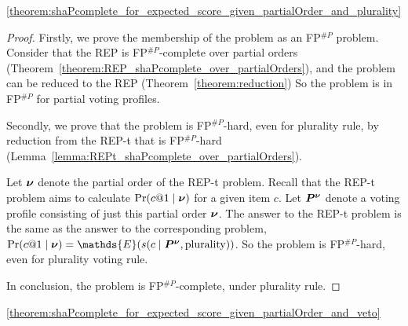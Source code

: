 \begin{reptheorem}{\ref{theorem:shaPcomplete_for_expected_score_given_partialOrder_and_plurality}}
    \theoremHardnessForEscGivenPartialOrderAndPlurality
\end{reptheorem}

\begin{proof}
    Firstly, we prove the membership of the \esc problem as an FP$^{\#P}$ problem.
    Consider that the REP is FP$^{\#P}$-complete over partial orders (Theorem~\ref{theorem:REP_shaPcomplete_over_partialOrders}), and the \esc problem can be reduced to the REP (Theorem~\ref{theorem:reduction})
    So the \esc problem is in FP$^{\#P}$ for partial voting profiles.
    
    Secondly, we prove that the \esc problem is FP$^{\#P}$-hard, even for plurality rule, by  reduction from the REP-t that is FP$^{\#P}$-hard (Lemma~\ref{lemma:REPt_shaPcomplete_over_partialOrders}).
    
    Let $\bm{\nu}$ denote the partial order of the REP-t problem.
    Recall that the REP-t problem aims to calculate $\Pr(c@1 \mid \bm{\nu})$ for a given item $c$.
    Let $\bm{P}^{\bm{\nu}}$ denote a voting profile consisting of just this partial order $\bm{\nu}$.
    The answer to the REP-t problem is the same as the answer to the corresponding \esc problem, \ie $\Pr(c@1 \mid \partialOrder) = \mathds{E}(\score(c \mid \VP^{\partialOrder}, \text{plurality}))$.
    So the \esc problem is FP$^{\#P}$-hard, even for plurality voting rule.
    
    In conclusion, the \esc problem is FP$^{\#P}$-complete, under plurality rule.
\end{proof}

\begin{reptheorem}{\ref{theorem:shaPcomplete_for_expected_score_given_partialOrder_and_veto}}
    \theoremHardnessForEscGivenPartialOrderAndVeto
\end{reptheorem}

